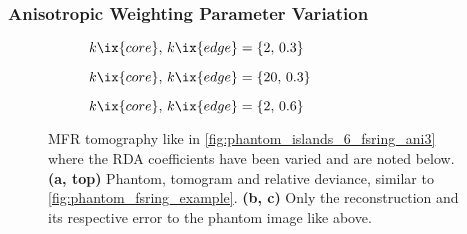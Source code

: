             \subsubsection*{Anisotropic Weighting Parameter Variation}%
%
                \begin{figure}[t]%
                    \centering%
                    \begin{subfigure}{\textwidth}%
                        \centering%
                        \caption{$k\ix{core},\,k\ix{edge}=\left\{2,\,0.3\right\}$}%
                    \end{subfigure}%
                    \newline%
                    \begin{subfigure}{\textwidth}%
                        \centering%
                        \caption{$k\ix{core},\,k\ix{edge}=\left\{20,\,0.3\right\}$}%
                    \end{subfigure}%
                    \newline%
                    \begin{subfigure}{\textwidth}%
                        \centering%
                        \caption{$k\ix{core},\,k\ix{edge}=\left\{2,\,0.6\right\}$}%
                    \end{subfigure}%
                    \caption{MFR tomography like in \cref{fig:phantom_islands_6_fsring_ani3} where the RDA coefficients have been varied and are noted below. \textbf{(a, top)} Phantom, tomogram and relative deviance, similar to \cref{fig:phantom_fsring_example}. \textbf{(b, c)} Only the reconstruction and its respective error to the phantom image like above.}\label{fig:phantom_islands_6_fsring_kanivar}%
                \end{figure}%
